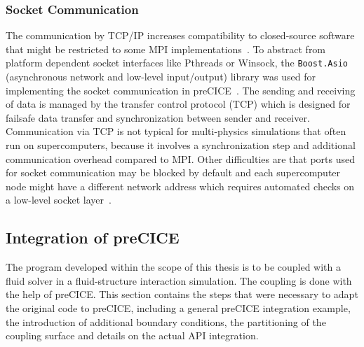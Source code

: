   \subsubsection{Socket Communication}\label{sec:Coupl-Communication-TCP}
   The communication by TCP/IP increases compatibility to closed-source software that might be restricted to some MPI implementations~\cite{bungartz2015fully}. To abstract from platform dependent socket interfaces like Pthreads or Winsock, the \texttt{Boost.Asio} (asynchronous network and low-level input/output) library was used for implementing the socket communication in preCICE~\cite{gatzhammer2015efficient}. The sending and receiving of data is managed by the transfer control protocol (TCP) which is designed for failsafe data transfer and synchronization between sender and receiver. Communication via TCP is not typical for multi-physics simulations that often run on supercomputers, because it involves a synchronization step and additional communication overhead compared to MPI. Other difficulties are that ports used for socket communication may be blocked by default and each supercomputer node might have a different network address which requires automated checks on a low-level socket layer~\cite{gatzhammer2015efficient}.


 \subsection{Integration of preCICE}\label{sec:Coupl-Impl}
  The program developed within the scope of this thesis is to be coupled with a fluid solver in a fluid-structure interaction simulation. The coupling is done with the help of preCICE. This section contains the steps that were necessary to adapt the original code to preCICE, including a general preCICE integration example, the introduction of additional boundary conditions, the partitioning of the coupling surface and details on the actual API integration.
  
  
